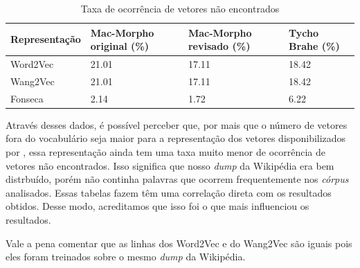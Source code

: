 






\begin{table}[!htb]
\footnotesize
\centering
\caption{Taxa de ocorrência de vetores não encontrados}
\label{tab:vetoresnaoencontradosocorrencia}
\begin{tabular}{lP{3cm}P{3cm}P{3cm}}
  \toprule
  \textbf{Representação} & \textbf{Mac-Morpho original (\%)}  & \textbf{Mac-Morpho revisado (\%)} & \textbf{Tycho Brahe (\%)} \\
  \midrule
  Word2Vec  & 21.01 & 17.11 & 18.42 \\
  Wang2Vec  & 21.01 & 17.11 & 18.42 \\
  Fonseca 	& 2.14  & 1.72  & 6.22 \\ 
  \bottomrule
\end{tabular}
\end{table}

Através desses dados, é possível perceber que, por mais que o número de vetores fora do vocabulário seja maior para a representação dos vetores disponibilizados por , essa representação ainda tem uma taxa muito menor de ocorrência de vetores não encontrados. Isso significa que nosso \textit{dump} da Wikipédia era bem distrbuído, porém não continha palavras que ocorrem frequentemente nos \textit{córpus} analisados. Essas tabelas fazem têm uma correlação direta com os resultados obtidos. Desse modo, acreditamos que isso foi o que mais influenciou os resultados.

Vale a pena comentar que as linhas dos Word2Vec e do Wang2Vec são iguais pois eles foram treinados sobre o mesmo \textit{dump} da Wikipédia.









